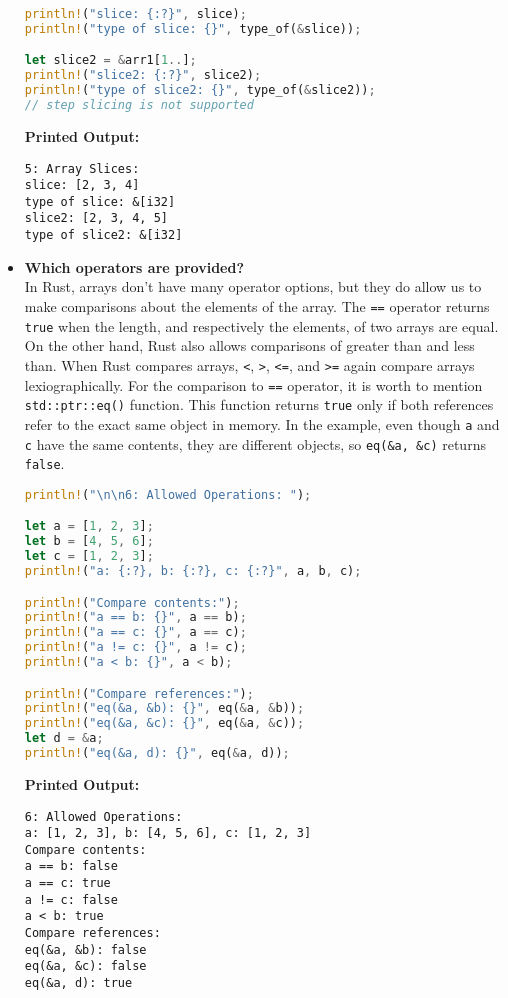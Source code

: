 \documentclass{article}
\begin{document}
\begin{itemize}
\begin{lstlisting}[language=Rust]
println!("slice: {:?}", slice);
println!("type of slice: {}", type_of(&slice));

let slice2 = &arr1[1..];
println!("slice2: {:?}", slice2);
println!("type of slice2: {}", type_of(&slice2));
// step slicing is not supported
\end{lstlisting}
\textbf{Printed Output:}
\begin{verbatim}
5: Array Slices: 
slice: [2, 3, 4]
type of slice: &[i32]
slice2: [2, 3, 4, 5]
type of slice2: &[i32]
\end{verbatim}



\item \textbf{Which operators are provided?} \\
In Rust, arrays don't have many operator options, but they do allow us to make comparisons about the elements of the array. The \texttt{==} operator returns \texttt{true} when the length, and respectively the elements, of two arrays are equal. On the other hand, Rust also allows comparisons of greater than and less than. When Rust compares arrays, \texttt{<}, \texttt{>}, \texttt{<=}, and \texttt{>=} again compare arrays lexiographically. For the comparison to \texttt{==} operator, it is worth to mention \texttt{std::ptr::eq()} function. This function returns \texttt{true} only if both references refer to the exact same object in memory. In the example, even though \texttt{a} and \texttt{c} have the same contents, they are different objects, so \texttt{eq(\&a, \&c)} returns \texttt{false}.


\begin{lstlisting}[language=Rust]
println!("\n\n6: Allowed Operations: ");

let a = [1, 2, 3];
let b = [4, 5, 6];
let c = [1, 2, 3];
println!("a: {:?}, b: {:?}, c: {:?}", a, b, c);

println!("Compare contents:");
println!("a == b: {}", a == b);
println!("a == c: {}", a == c);
println!("a != c: {}", a != c); 
println!("a < b: {}", a < b); 

println!("Compare references:");
println!("eq(&a, &b): {}", eq(&a, &b));
println!("eq(&a, &c): {}", eq(&a, &c));
let d = &a;
println!("eq(&a, d): {}", eq(&a, d));
\end{lstlisting}
\textbf{Printed Output:}
\begin{verbatim}
6: Allowed Operations: 
a: [1, 2, 3], b: [4, 5, 6], c: [1, 2, 3]
Compare contents:
a == b: false
a == c: true
a != c: false
a < b: true
Compare references:
eq(&a, &b): false
eq(&a, &c): false
eq(&a, d): true
\end{verbatim} 
\end{itemize}
\newpage
\end{document}
